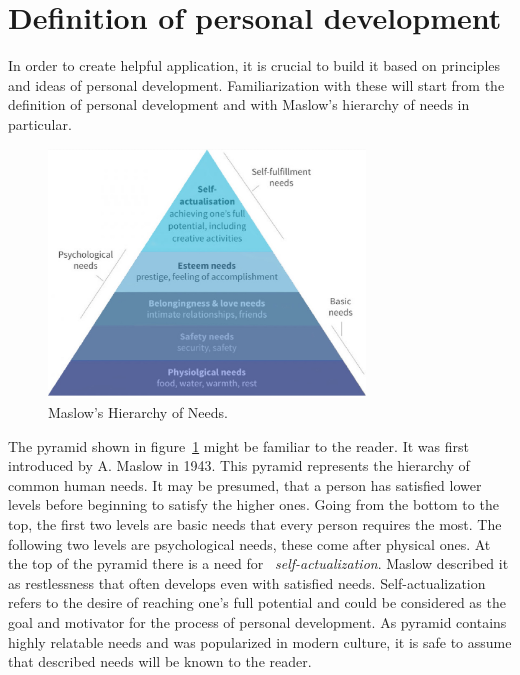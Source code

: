 
\section{Definition of personal development}\label{sec:definition-of-personal-development}

In order to create helpful application, it is crucial to build it based on principles and ideas of personal development.
Familiarization with these will start from the definition of personal development and with Maslow's hierarchy of needs in particular.

\begin{figure}[h]
    \includegraphics[width=0.75\textwidth]{images/maslows.jpg}
    \caption{Maslow's Hierarchy of Needs.\cite{maslow-pyramid}}
    \label{fig:maslow-pyramid}
\end{figure}

The pyramid shown in figure~\ref{fig:maslow-pyramid} might be familiar to the reader.
It was first introduced by A. Maslow in 1943.\cite{maslow-motivation}
This pyramid represents the hierarchy of common human needs.
It may be presumed, that a person has satisfied lower levels before beginning to satisfy the higher ones.
Going from the bottom to the top, the first two levels are basic needs that every person requires the most.
The following two levels are psychological needs, these come after physical ones.
At the top of the pyramid there is a need for ~\textit{self-actualization}.
Maslow described it as restlessness that often develops even with satisfied needs.
Self-actualization refers to the desire of reaching one's full potential and could be considered as the goal and motivator for the process of personal development.
As pyramid contains highly relatable needs and was popularized in modern culture, it is safe to assume that described needs will be known to the reader.

